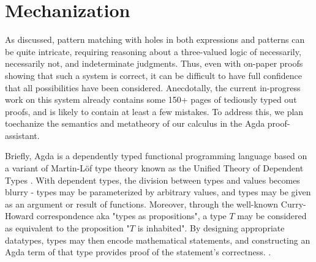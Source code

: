 \section{Mechanization}\label{sec:mechanization}
As discussed, pattern matching with holes in both expressions and patterns can be quite intricate, requiring reasoning about a three-valued logic of necessarily, necessarily not, and indeterminate judgments. Thus, even with on-paper proofs showing that such a system is correct, it can be difficult to have full confidence that all possibilities have been considered. Anecdotally, the current in-progress work on this system already contains some 150+ pages of tediously typed out proofs, and is likely to contain at least a few mistakes. To address this, we plan toechanize the semantics and metatheory of our calculus in the Agda proof-assistant.

Briefly, Agda is a dependently typed functional programming language based on a variant of Martin-L\"of type theory known as the Unified Theory of Dependent Types . With dependent types, the division between types and values becomes blurry - types may be parameterized by arbitrary values, and types may be given as an argument or result of functions. Moreover, through the well-known Curry-Howard correspondence aka "types as propositions", a type $T$ may be considered as equivalent to the proposition "$T$ is inhabited". By designing appropriate datatypes, types may then encode mathematical statements, and constructing an Agda term of that type provides proof of the statement's correctness.  .